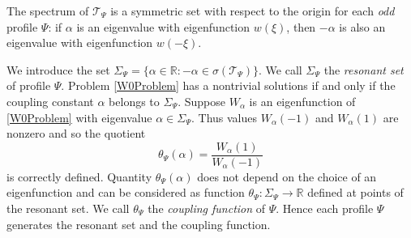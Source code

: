 \documentclass[11pt,english]{amsart}
\begin{document}
\begin{g_remark}\label{RemarkOnOddPsi}\rm
The spectrum of $\mathcal{T}_\Psi$ is a symmetric set  with respect to the origin for each \emph{odd} profile $\Psi$:
if $\alpha$ is an eigenvalue with eigenfunction $w(\xi)$, then $-\alpha$ is also an eigenvalue with eigenfunction $w(-\xi)$.
\end{g_remark}

We introduce the set $\Sigma_\Psi=\{\alpha\in \mathbb{R}\colon -\alpha\in \sigma(\mathcal{T}_\Psi)\} $. We call
$\Sigma_\Psi$ the \emph{resonant set} of  profile  $\Psi$.
Problem \eqref{W0Problem} has a nontrivial solutions if and only if the coupling constant $\alpha$ belongs to  $\Sigma_\Psi$. Suppose $W_\alpha$ is an eigenfunction of \eqref{W0Problem} with eigenvalue $\alpha\in \Sigma_\Psi$. Thus values $W_\alpha(-1)$ and $W_\alpha(1)$ are nonzero and so the quotient
$$
\theta_\Psi (\alpha)=\frac{W_\alpha(1)}{W_\alpha(-1)}
$$
is correctly defined.
Quantity $\theta_\Psi (\alpha)$ does not depend on the choice of an eigenfunction and can be considered as  function $\theta_\Psi \colon\Sigma_\Psi \to \mathbb{R}$ defined at points of the resonant set. We call $\theta_\Psi$
the  \emph{coupling function} of  $\Psi$. Hence each profile $\Psi$ generates the resonant set and the coupling function.
\end{document}
